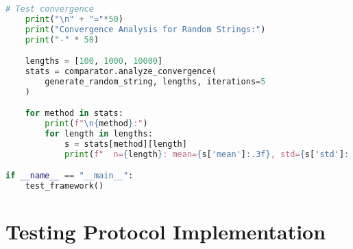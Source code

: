 \documentclass[12pt,a4paper]{report}
\begin{document}
\begin{lstlisting}[language=Python, caption=Complexity Estimation Framework]
    # Test convergence
    print("\n" + "="*50)
    print("Convergence Analysis for Random Strings:")
    print("-" * 50)

    lengths = [100, 1000, 10000]
    stats = comparator.analyze_convergence(
        generate_random_string, lengths, iterations=5
    )

    for method in stats:
        print(f"\n{method}:")
        for length in lengths:
            s = stats[method][length]
            print(f"  n={length}: mean={s['mean']:.3f}, std={s['std']:.3f}")

if __name__ == "__main__":
    test_framework()
\end{lstlisting}

\section{Testing Protocol Implementation}
\end{document}
